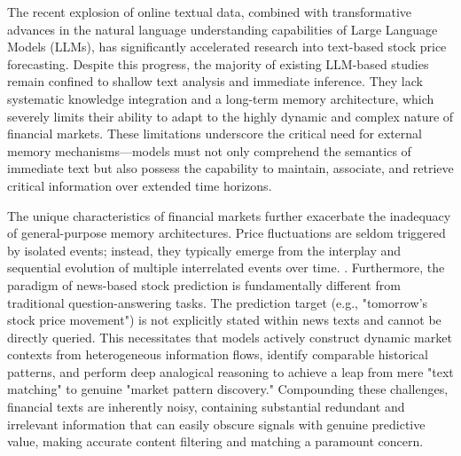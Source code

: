 \documentclass[sigconf, nonacm]{acmart} %
\begin{document}
The recent explosion of online textual data, combined with transformative advances in the natural language understanding capabilities of Large Language Models (LLMs), has significantly accelerated research into text-based stock price forecasting. 
Despite this progress, the majority of existing LLM-based studies remain confined to shallow text analysis and immediate inference\cite{vuong2025predicting}. They lack systematic knowledge integration and a long-term memory architecture, which severely limits their ability to adapt to the highly dynamic and complex nature of financial markets. 
These limitations underscore the critical need for external memory mechanisms—models must not only comprehend the semantics of immediate text but also possess the capability to maintain, associate, and retrieve critical information over extended time horizons.

The unique characteristics of financial markets further exacerbate the inadequacy of general-purpose memory architectures. Price fluctuations are seldom triggered by isolated events; instead, they typically emerge from the interplay and sequential evolution of multiple interrelated events over time\cite{yee2025trading}. . 
Furthermore, the paradigm of news-based stock prediction is fundamentally different from traditional question-answering tasks. The prediction target (e.g., "tomorrow's stock price movement") is not explicitly stated within news texts and cannot be directly queried\cite{chen2025stockbench}. This necessitates that models actively construct dynamic market contexts from heterogeneous information flows, identify comparable historical patterns, and perform deep analogical reasoning to achieve a leap from mere "text matching" to genuine "market pattern discovery." 
Compounding these challenges, financial texts are inherently noisy, containing substantial redundant and irrelevant information that can easily obscure signals with genuine predictive value\cite{kamble2025failsafeqa}, making accurate content filtering and matching a paramount concern.
\end{document}
